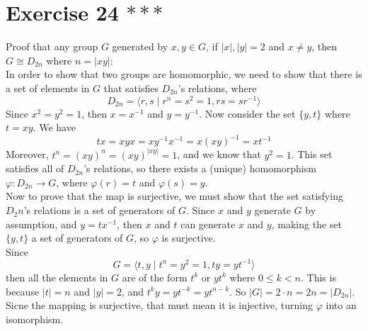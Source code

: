 \documentclass[12pt]{article}
\begin{document}
    
    \section*{Exercise 24 $***$}
    Proof that any group $G$ generated by $x, y \in G$,
    if $|x|, |y| = 2$ and $x \neq y$,
    then $G \cong D_{2n}$ where $n = |xy|$: \\
    In order to show that two groups are homomorphic,
    we need to show that there is a set of elements in $G$
    that satisfies $D_{2n}$'s relations,
    where \[ D_{2n} = \langle r, s \mid r^n = s^2 = 1, rs = sr^{-1} \rangle \]
    Since $x^2 = y^2 = 1$,
    then $x = x^{-1}$ and $y = y^{-1}$.
    Now consider the set $\{y, t\}$ where $t = xy$.
    We have \[ tx = xyx = xy^{-1}x^{-1} = x(xy)^{-1} = xt^{-1}\]
    Moreover, $t^n = (xy)^n = (xy)^{|xy|} = 1$,
    and we know that $y^2 = 1$.
    This set satisfies all of $D_{2n}$'s relations,
    so there exists a (unique) homomorphism $\varphi: D_{2n} \to G$,
    where $\varphi(r) = t$ and $\varphi(s) = y$. \\
    Now to prove that the map is surjective,
    we must show that the set satisfying $D_2n$'s relations is a set of
    generators of $G$.
    Since $x$ and $y$ generate $G$ by assumption, and $y = tx^{-1}$,
    then $x$ and $t$ can generate $x$ and $y$, 
    making the set $\{y, t\}$ a set of generators of $G$,
    so $\varphi$ is surjective. \\
    Since \[ G = \langle t, y \mid t^n = y^2 = 1, ty = yt^{-1} \rangle \]
    then all the elements in $G$ are of the form $t^k$ or $yt^k$
    where $0 \leqslant k < n$.
    This is because $|t| = n$ and $|y| = 2$,
    and $t^ky = yt^{-k} = yt^{n-k}$.
    So $|G| = 2 \cdot n = 2n = |D_{2n}|$.
    Sicne the mapping is surjective,
    that must mean it is injective,
    turning $\varphi$ into an isomorphism.
\end{document}
